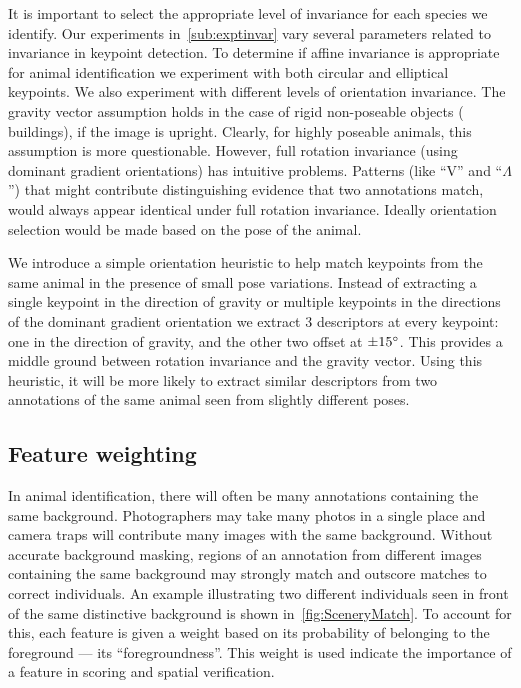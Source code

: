         It is important to select the appropriate level of invariance for each species we identify.
        Our experiments in~\cref{sub:exptinvar} vary several parameters related to invariance in keypoint
        detection. To determine if affine invariance is appropriate for animal identification we experiment with
        both circular and elliptical keypoints.
        We also experiment with different levels of orientation invariance. The gravity vector assumption holds in
        the case of rigid non-poseable objects (\eg{} buildings), if the image is upright. Clearly, for highly
        poseable animals, this assumption is more questionable. However, full rotation invariance (using dominant
        gradient orientations) has intuitive problems. Patterns (like ``V'' and ``$\Lambda$'') that might
        contribute distinguishing evidence that two annotations match, would always appear identical under full
        rotation invariance. Ideally orientation selection would be made based on the pose of the animal.

        We introduce a simple orientation heuristic to help match keypoints from the same animal in the presence of
        small pose variations. Instead of extracting a single keypoint in the direction of gravity or multiple
        keypoints in the directions of the dominant gradient orientation we extract 3 descriptors at every
        keypoint: one in the direction of gravity, and the other two offset at $\pm15^{\circ}$. This provides a
        middle ground between rotation invariance and the gravity vector. Using this heuristic, it will be more
        likely to extract similar descriptors from two annotations of the same animal seen from slightly different
        poses.

    \subsection{Feature weighting}
     
        In animal identification, there will often be many annotations containing the same background.
        Photographers may take many photos in a single place and camera traps will contribute many images with the
        same background. Without accurate background masking, regions of an annotation from different images
        containing the same background may strongly match and outscore matches to correct individuals. An example
        illustrating two different individuals seen in front of the same distinctive background is shown
        in~\cref{fig:SceneryMatch}. To account for this, each feature is given a weight based on its probability of
        belonging to the foreground --- its ``foregroundness''. This weight is used indicate the importance of a
        feature in scoring and spatial verification.

